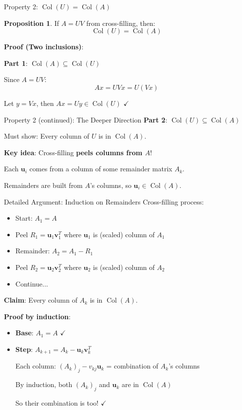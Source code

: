 \documentclass[10pt]{beamer}
\theoremstyle{definition}
\newtheorem{prop}{Proposition}[section]
\newcommand{\x}[1]{\alert{\textbf{#1}}}
\begin{document}
\begin{frame}{Property 2: $\operatorname{Col}(U) = \operatorname{Col}(A)$}
\begin{prop}
If $A = UV$ from cross-filling, then:
$$\operatorname{Col}(U) = \operatorname{Col}(A)$$
\end{prop}

\vfill
\textbf{Proof (Two inclusions)}:

\x{Part 1}: $\operatorname{Col}(A) \subseteq \operatorname{Col}(U)$

Since $A = UV$:
$$Ax = UV x = U(Vx)$$

Let $y = Vx$, then $Ax = Uy \in \operatorname{Col}(U)$ $\checkmark$
\end{frame}

\begin{frame}{Property 2 (continued): The Deeper Direction}
\x{Part 2}: $\operatorname{Col}(U) \subseteq \operatorname{Col}(A)$

Must show: Every column of $U$ is in $\operatorname{Col}(A)$.

\vfill
\textbf{Key idea}: Cross-filling \x{peels columns from $A$}!

Each $\mathbf{u}_i$ comes from a column of some remainder matrix $A_k$.

Remainders are built from $A$'s columns, so $\mathbf{u}_i \in \operatorname{Col}(A)$.
\end{frame}

\begin{frame}{Detailed Argument: Induction on Remainders}
Cross-filling process:
\begin{itemize}
\item Start: $A_1 = A$
\item Peel $R_1 = \mathbf{u}_1\mathbf{v}_1^T$ where $\mathbf{u}_1$ is (scaled) column of $A_1$
\item Remainder: $A_2 = A_1 - R_1$
\item Peel $R_2 = \mathbf{u}_2\mathbf{v}_2^T$ where $\mathbf{u}_2$ is (scaled) column of $A_2$
\item Continue...
\end{itemize}

\vfill
\x{Claim}: Every column of $A_k$ is in $\operatorname{Col}(A)$.

\textbf{Proof by induction}:
\begin{itemize}
\item \x{Base}: $A_1 = A$ $\checkmark$
\item \x{Step}: $A_{k+1} = A_k - \mathbf{u}_k\mathbf{v}_k^T$

Each column: $(A_k)_j - v_{kj}\mathbf{u}_k$ = combination of $A_k$'s columns

By induction, both $(A_k)_j$ and $\mathbf{u}_k$ are in $\operatorname{Col}(A)$

So their combination is too! $\checkmark$
\end{itemize}
\end{frame}
\end{document}
